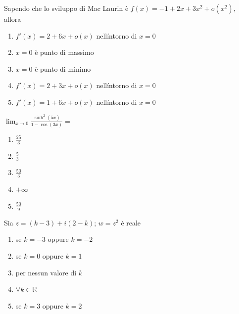 \begin{quiz}
Sapendo che lo sviluppo di Mac Laurin \`e $f(x)=-1+2x+3x^2+o(x^2)$, allora
\begin{enumerate}
\item $f\prime(x)=2+6x+o(x)$ nell\'intorno di $x=0$
\item $x=0$ \`e punto di massimo
\item $x=0$ \`e punto di minimo
\item $f\prime(x)=2+3x+o(x)$ nell\'intorno di $x=0$
\item $f\prime(x)=1+6x+o(x)$ nell\'intorno di $x=0$
\end{enumerate}
\end{quiz}

\begin{quiz}
$\displaystyle\lim_{x\to0}\frac{\sinh^2(5x)}{1-\cos(3x)}=$
\begin{enumerate}
\item $\frac{25}{3}$
\item $\frac53$
\item $\frac{50}{3}$
\item $+\infty$
\item $\frac{50}{9}$
\end{enumerate}
\end{quiz}

\begin{quiz}
Sia $z=(k-3)+i(2-k)$; $w=z^2$ \`e reale
\begin{enumerate}
\item se $k=-3$ oppure $k=-2$
\item se $k=0$ oppure $k=1$
\item per nessun valore di $k$
\item $\forall k\in\mathbb R$
\item se $k=3$ oppure $k=2$
\end{enumerate}
\end{quiz}

